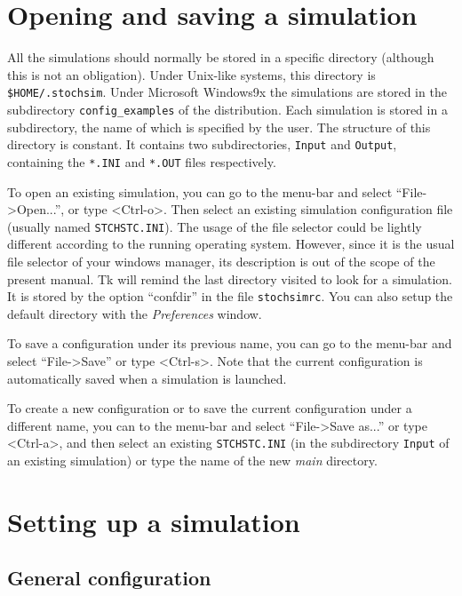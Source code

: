 \section{Opening and saving a simulation}

All the simulations should normally be stored in a specific directory (although
this is not an obligation). Under Unix-like systems, this
directory is \texttt{\$HOME/.stochsim}. Under Microsoft Windows9x the
simulations are stored in the subdirectory \texttt{config\_examples} of the
\stochsim{} distribution.  Each simulation is stored in a subdirectory, the
name of which is specified by the user. The structure of this directory is
constant.  It contains two subdirectories, \texttt{Input} and \texttt{Output},
containing the \texttt{*.INI} and \texttt{*.OUT} files respectively.

To open an existing simulation, you can go to the menu-bar and select
``File->Open...'', or type \mbox{<Ctrl-o>}. Then select an existing simulation
configuration file (usually named \texttt{STCHSTC.INI}). The usage of the file
selector could be lightly different according to the running operating system.
However, since it is the usual file selector of your windows manager, its
description is out of the scope of the present manual. Tk\stochsim{} will
remind the last directory visited to look for a simulation. It is stored by the
option ``confdir'' in the file \texttt{stochsimrc}. You can also setup the
default directory with the \emph{Preferences} window.

To save a configuration under its previous name, you can go to the menu-bar and
select ``File->Save'' or type \mbox{<Ctrl-s>}. Note that the current configuration
is automatically saved when a simulation is launched.

To create a new configuration or to save the current configuration under a
different name, you can to the menu-bar and select ``File->Save as...'' or type
\mbox{<Ctrl-a>}, and then select an existing \texttt{STCHSTC.INI} (in the
subdirectory \texttt{Input} of an existing simulation) or type the name of the
new \emph{main} directory.


\section{Setting up a simulation}

\subsection{General configuration}\label{genconfig}

